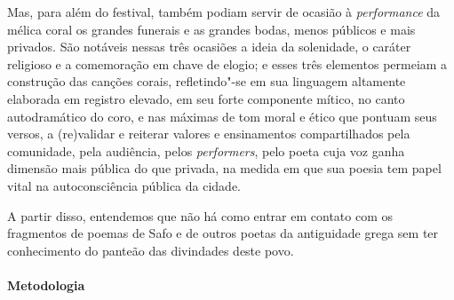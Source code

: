 \documentclass[12pt]{extarticle}
\begin{document}
Mas, para além do festival, também podiam servir de ocasião à
\textit{performance} da mélica coral os grandes funerais e as grandes bodas,
menos públicos e mais privados. São notáveis nessas três ocasiões a ideia da
solenidade, o caráter religioso e a comemoração em chave de elogio; e esses
três elementos permeiam a construção das canções corais, refletindo"-se
em sua linguagem altamente elaborada em registro elevado, em seu forte
componente mítico, no canto autodramático do coro, e nas máximas de tom moral
e ético que pontuam seus versos, a (re)validar e reiterar valores e
ensinamentos compartilhados pela comunidade, pela audiência, pelos
\textit{performers}, pelo poeta cuja voz ganha dimensão mais
pública do que privada, na medida em que sua poesia tem papel vital na autoconsciência 
pública da cidade.

A partir disso, entendemos que não há como entrar em contato com os fragmentos 
de poemas de Safo e de outros poetas da antiguidade grega sem ter conhecimento 
do panteão das divindades deste povo.

\paragraph{Metodologia}
\end{document}
